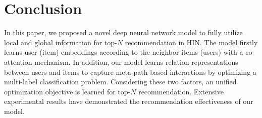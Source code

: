 \section{Conclusion}
In this paper, we proposed a novel deep neural network model to fully utilize local and global information for top-$N$ recommendation in HIN. The model firstly learns user (item) embeddings according to the neighbor items (users) with a co-attention mechanism. In addition, our model learns relation representations between users and items to capture meta-path based interactions by optimizing a multi-label classification problem. Considering these two factors, an unified optimization objective is learned for top-$N$ recommendation. Extensive experimental results have demonstrated the recommendation effectiveness of our model. 